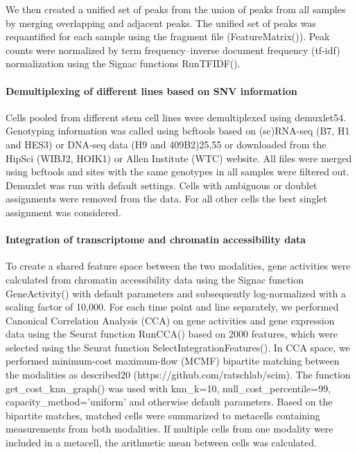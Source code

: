  
We then created a unified set of peaks from the union of peaks from all samples by merging overlapping and adjacent peaks. The unified set of peaks was requantified for each sample using the fragment file (FeatureMatrix()). Peak counts were normalized by term frequency–inverse document frequency (tf-idf) normalization using the Signac functions RunTFIDF().
 
\paragraph{Demultiplexing of different lines based on SNV information}
Cells pooled from different stem cell lines were demultiplexed using demuxlet54. Genotyping information was called using bcftools based on (sc)RNA-seq (B7, H1 and HES3) or DNA-seq data (H9 and 409B2)25,55 or downloaded from the HipSci (WIBJ2, HOIK1) or Allen Institute (WTC) website. All files were merged using bcftools and sites with the same genotypes in all samples were filtered out. Demuxlet was run with default settings. Cells with ambiguous or doublet assignments were removed from the data. For all other cells the best singlet assignment was considered.
 
\paragraph{Integration of transcriptome and chromatin accessibility data}
To create a shared feature space between the two modalities, gene activities were calculated from chromatin accessibility data using the Signac function GeneActivity() with default parameters and subsequently log-normalized with a scaling factor of 10,000. For each time point and line separately, we performed Canonical Correlation Analysis (CCA) on gene activities and gene expression data using the Seurat function RunCCA() based on 2000 features, which were selected using the Seurat function SelectIntegrationFeatures(). In CCA space, we performed minimum-cost maximum-flow (MCMF) bipartite matching between the modalities as described20 (https://github.com/ratschlab/scim). The function get\_cost\_knn\_graph() was used with knn\_k=10, null\_cost\_percentile=99, capacity\_method=’uniform’ and otherwise default parameters. Based on the bipartite matches, matched cells were summarized to metacells containing measurements from both modalities. If multiple cells from one modality were included in a metacell, the arithmetic mean between cells was calculated.
 
